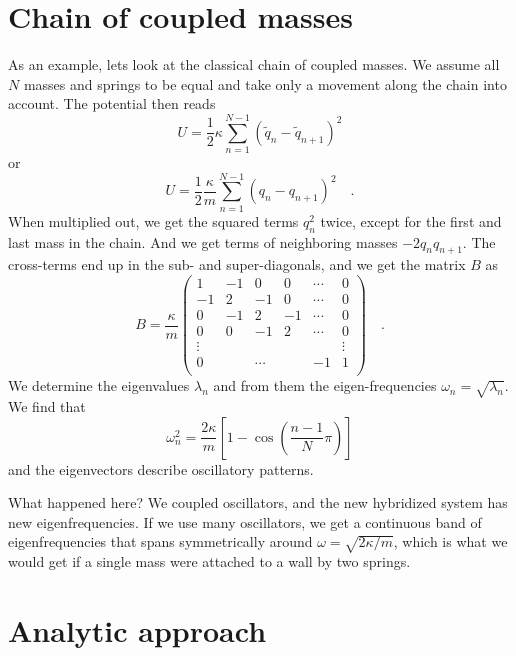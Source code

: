  \section{Chain of coupled masses}

As an example, lets look at the classical chain of coupled masses. We assume all $N$ masses and springs to be equal and take only a movement along the chain into account. The potential then reads
\begin{equation}
    U = \frac{1}{2} \kappa \sum_{n=1}^{N-1} ( \tilde{q}_n - \tilde{q}_{n+1} )^2
\end{equation}
or
\begin{equation}
U = \frac{1}{2} \frac{\kappa}{m} \sum_{n=1}^{N-1}  ( q_n - q_{n+1} )^2 \quad .
\end{equation}
When multiplied out, we get the squared terms $q_n^2$ twice, except for the first and last mass in the chain. And we get terms of neighboring masses $- 2 q_n q_{n+1}$. 
The cross-terms end up in the sub- and super-diagonals, and we get the matrix $B$ as 
\begin{equation}
B =\frac{\kappa}{m} \begin{pmatrix}
 1 & -1 & 0 &  0 & \cdots & 0 \\
-1 & 2 & -1 &  0 & \cdots & 0 \\
0  & -1 & 2 &  -1 & \cdots & 0 \\
0 & 0  & -1 & 2 &   \cdots & 0 \\
\vdots  & & &  &  & \vdots \\
0 &   & \cdots    &    & -1 & 1 \\
\end{pmatrix} \quad .
\end{equation}
We determine the eigenvalues $\lambda_n$ and from them the eigen-frequencies $\omega_n = \sqrt{\lambda_n}$. We find that
\begin{equation}
  \omega_n^2 = \frac{2 \kappa}{m} \left[ 1 - \cos \left(\frac{n-1}{N} \pi \right) \right] 
  \label{eq:5_omega_diag}
\end{equation}
and the eigenvectors describe oscillatory patterns.


What happened here? We coupled oscillators, and the new hybridized system has new eigenfrequencies. If we use many oscillators, we get a continuous band of eigenfrequencies that spans symmetrically around $\omega = \sqrt{2 \kappa / m}$, which is what we would get if a single mass were attached to a wall by two springs.


\section{Analytic approach}


